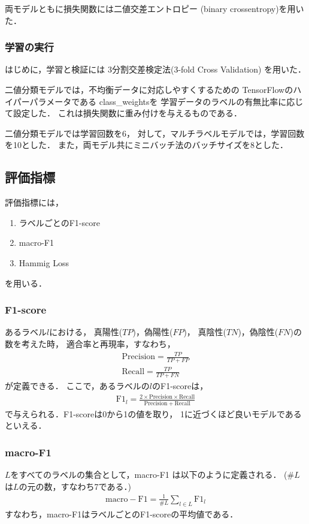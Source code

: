 両モデルともに損失関数には二値交差エントロピー
(binary crossentropy)を用いた．

\subsubsection{学習の実行}
はじめに，学習と検証には
3分割交差検定法(3-fold Cross Validation)
を用いた．

二値分類モデルでは，不均衡データに対応しやすくするための
TensorFlowのハイパーパラメータである
class\_weights\cite{unbalanced-data}を
学習データのラベルの有無比率に応じて設定した．
これは損失関数に重み付けを与えるものである．

二値分類モデルでは学習回数を6，
対して，マルチラベルモデルでは，学習回数を10とした．
また，両モデル共にミニバッチ法のバッチサイズを8とした．

\subsection{評価指標}
評価指標には，
\begin{enumerate}
  \item ラベルごとのF1-score
  \item macro-F1
  \item Hammig Loss
\end{enumerate}
を用いる．
\subsubsection{F1-score}
あるラベル$l$における，
真陽性($TP$)，偽陽性($FP$)，
真陰性($TN$)，偽陰性($FN$)の数を考えた時，
適合率と再現率，すなわち，
\begin{align*}
  \mathrm{Precision} = \frac{TP}{TP+FP} \\
  \mathrm{Recall} = \frac{TP}{TP+FN} 
\end{align*}
が定義できる．
ここで，あるラベルの$l$のF1-scoreは，
\begin{align*}
  \mathrm{F1}_l = \frac{2\times \mathrm{Precision} \times 
  \mathrm{Recall}}{\mathrm{Precision} + \mathrm{Recall}}
\end{align*}
で与えられる．F1-scoreは0から1の値を取り，
1に近づくほど良いモデルであるといえる．
\subsubsection{macro-F1}
$L$をすべてのラベルの集合として，macro-F1
は以下のように定義される．
($\# L$は$L$の元の数，すなわち7である．)
\begin{align*}
  \mathrm{macro-F1} = \frac{1}{\# L} \sum_{l \in L} \mathrm{F1}_l
\end{align*}
すなわち，macro-F1はラベルごとのF1-scoreの平均値である．
